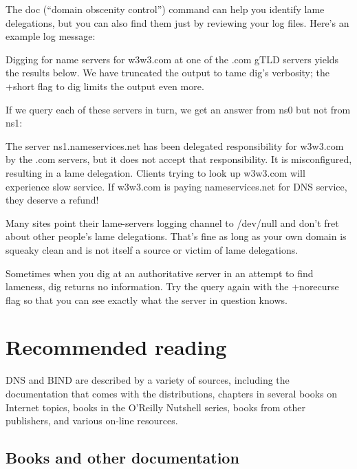 The
{doc}{\protect\hypertarget{part0024_split_072.htmlux5cux23_idIndexMarker2298}{}{}\protect\hypertarget{part0024_split_072.htmlux5cux23_idIndexMarker2299}{}{}}
(``domain obscenity control'') command can help you identify lame
delegations, but you can also find them just by reviewing your log
files. Here's an example log message:


Digging for name servers for w3w3.com at one of the .com gTLD servers
yields the results below. We have truncated the output to tame {dig}'s
verbosity; the {+short} flag to {dig} limits the output even more.


If we query each of these servers in turn, we get an answer from ns0 but
not from ns1:


The server ns1.nameservices.net has been delegated responsibility for
w3w3.com by the .com servers, but it does not accept that
responsibility. It is misconfigured, resulting in a lame delegation.
Clients trying to look up w3w3.com will experience slow service. If
w3w3.com is paying nameservices.net for DNS service, they deserve a
refund!

Many sites point their {lame-servers} logging channel to {/dev/null} and
don't fret about other people's lame delegations. That's fine as long as
your own domain is squeaky clean and is not itself a source or victim of
lame delegations.

Sometimes when you {dig} at an authoritative server in an attempt to
find lameness, {dig} returns no information. Try the query again with
the {+norecurse} flag so that you can see exactly what the server in
question knows.



\section{Recommended reading}

DNS and BIND are described by a variety of sources, including the
documentation that comes with the distributions, chapters in several
books on Internet topics, books in the O'Reilly Nutshell series, books
from other publishers, and various on-line resources.

\protect\hypertarget{part0024_split_074.html}{}{}

\hypertarget{part0024_split_074.htmlux5cux23_idContainer1069}{}
\hypertarget{part0024_split_074.htmlux5cux23calibre_pb_73}{%
\subsection[Books and other
documentation]{\texorpdfstring{\protect\hypertarget{part0024_split_074.htmlux5cux23_idTextAnchor968}{}{}Books
and other
documentation}{Books and other documentation}}\label{part0024_split_074.htmlux5cux23calibre_pb_73}}

